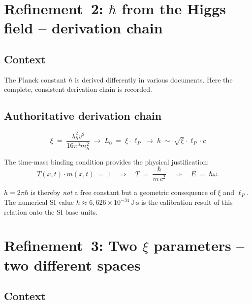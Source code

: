 \section{\texorpdfstring{Refinement~2: $\hbar$ from the Higgs field -- derivation chain}{Refinement 2: hbar from the Higgs field -- derivation chain}}

\subsection*{Context}

The Planck constant $\hbar$ is derived differently in various documents. Here
the complete, consistent derivation chain is recorded.

\subsection*{Authoritative derivation chain}

\begin{equation}
  \xi \;=\; \frac{\lambda_h^2 v^2}{16\pi^3 m_h^2}
  \;\longrightarrow\;
  L_0 \;=\; \xi \cdot \ell_P
  \;\longrightarrow\;
  \hbar \;\sim\; \sqrt{\xi}\cdot \ell_P \cdot c
  \tag{190.8}
\end{equation}

The time-mass binding condition provides the physical justification:
\begin{equation}
  T(x,t)\cdot m(x,t) \;=\; 1
  \quad\Longrightarrow\quad
  T \;=\; \frac{\hbar}{m\, c^2}
  \quad\Longrightarrow\quad
  E \;=\; \hbar\omega.
  \tag{190.9}
\end{equation}

$h = 2\pi\hbar$ is thereby \emph{not} a free constant but a geometric
consequence of $\xi$ and $\ell_P$. The numerical SI value
$h \approx 6{,}626 \times 10^{-34}\,\text{J·s}$ is the calibration result of
this relation onto the SI base units.

\section{\texorpdfstring{Refinement~3: Two $\xi$ parameters -- two different spaces}{Refinement 3: Two xi parameters -- two different spaces}}

\subsection*{Context}

